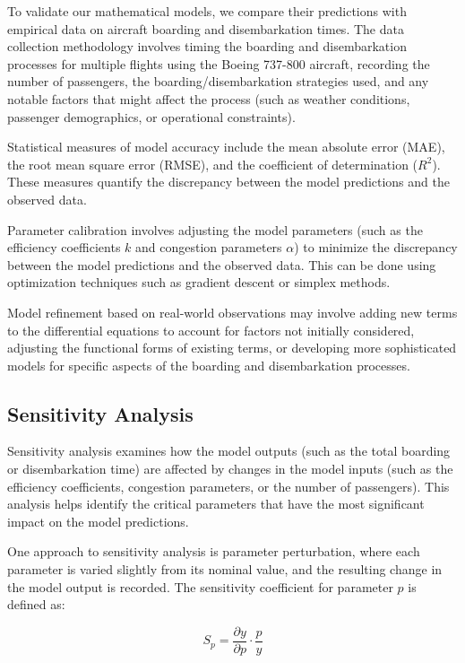 \documentclass[12pt,a4paper]{article}
\begin{document}
To validate our mathematical models, we compare their predictions with empirical data on aircraft boarding and disembarkation times. The data collection methodology involves timing the boarding and disembarkation processes for multiple flights using the Boeing 737-800 aircraft, recording the number of passengers, the boarding/disembarkation strategies used, and any notable factors that might affect the process (such as weather conditions, passenger demographics, or operational constraints).

Statistical measures of model accuracy include the mean absolute error (MAE), the root mean square error (RMSE), and the coefficient of determination ($R^2$). These measures quantify the discrepancy between the model predictions and the observed data.

Parameter calibration involves adjusting the model parameters (such as the efficiency coefficients $k$ and congestion parameters $\alpha$) to minimize the discrepancy between the model predictions and the observed data. This can be done using optimization techniques such as gradient descent or simplex methods.

Model refinement based on real-world observations may involve adding new terms to the differential equations to account for factors not initially considered, adjusting the functional forms of existing terms, or developing more sophisticated models for specific aspects of the boarding and disembarkation processes.

\subsection{Sensitivity Analysis}

Sensitivity analysis examines how the model outputs (such as the total boarding or disembarkation time) are affected by changes in the model inputs (such as the efficiency coefficients, congestion parameters, or the number of passengers). This analysis helps identify the critical parameters that have the most significant impact on the model predictions.

One approach to sensitivity analysis is parameter perturbation, where each parameter is varied slightly from its nominal value, and the resulting change in the model output is recorded. The sensitivity coefficient for parameter $p$ is defined as:

\begin{equation}
S_p = \frac{\partial y}{\partial p} \cdot \frac{p}{y}
\label{eq:sensitivity}
\end{equation}
\end{document}
